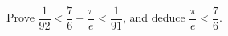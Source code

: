Prove $\dfrac{1}{92}<\dfrac{7}{6}-\dfrac{\pi}{e}<\dfrac{1}{91}$, and deduce $\dfrac{\pi}{e}<\dfrac{7}{6}$.

